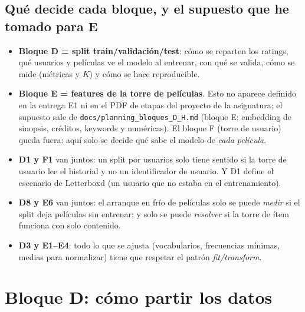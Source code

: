 \documentclass[a4paper,11pt]{article}
\begin{document}
\subsection{Qué decide cada bloque, y el supuesto que he tomado para E}
\begin{itemize}
  \item \textbf{Bloque D = split train/validación/test}: cómo se reparten los ratings, qué usuarios y películas ve el
        modelo al entrenar, con qué se valida, cómo se mide (métricas y $K$) y cómo se hace reproducible.
  \item \textbf{Bloque E = features de la torre de películas}. Esto no aparece definido en la entrega E1 ni en el PDF
        de etapas del proyecto de la asignatura; el supuesto sale de \texttt{docs/\allowbreak planning\_\allowbreak bloques\_\allowbreak D\_H.md} (bloque E:
        embedding de sinopsis, créditos, keywords y numéricas). El bloque F (torre de usuario) queda fuera: aquí solo se
        decide qué sabe el modelo de \emph{cada película}.
\end{itemize}

\begin{ojo}
\begin{itemize}[leftmargin=*]
  \item \textbf{D1 y F1} van juntos: un split por usuarios solo tiene sentido si la torre de usuario lee el historial y
        no un identificador de usuario. Y D1 define el escenario de Letterboxd (un usuario que no estaba en el
        entrenamiento).
  \item \textbf{D8 y E6} van juntos: el arranque en frío de películas solo se puede \emph{medir} si el split deja
        películas sin entrenar; y solo se puede \emph{resolver} si la torre de ítem funciona con solo contenido.
  \item \textbf{D3 y E1--E4}: todo lo que se ajusta (vocabularios, frecuencias mínimas, medias para normalizar) tiene
        que respetar el patrón \emph{fit/transform}.
\end{itemize}
\end{ojo}

\section{Bloque D: cómo partir los datos}\label{sec:D}
\end{document}
